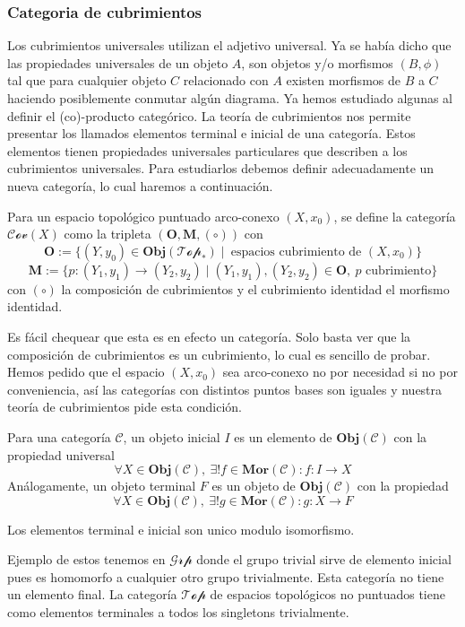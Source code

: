 \subsubsection{Categoria de cubrimientos}
Los cubrimientos universales utilizan el adjetivo universal. Ya se había
dicho que las propiedades universales de un objeto \(A\), son objetos
y/o morfismos \((B,\phi)\) tal que para cualquier objeto \(C\) relacionado
con \(A\) existen morfismos de \(B\) a \(C\) haciendo posiblemente
conmutar algún diagrama. Ya hemos estudiado algunas al definir el
(co)-producto categórico. La teoría de cubrimientos nos permite
presentar los llamados elementos terminal e inicial de una categoría.
Estos elementos tienen propiedades universales particulares que
describen a los cubrimientos universales. Para estudiarlos debemos
definir adecuadamente un nueva categoría, lo cual haremos a
continuación.
\begin{definicion}
  Para un espacio topológico puntuado arco-conexo \((X,x_0)\), se define
  la categoría \(\mathscr{Cov}(X)\) como la tripleta \(\left( \mathbf O,
  \mathbf M, (\circ) \right)\) con
\[ \mathbf O := \{ (Y, y_0) \in \mathbf{Obj}(\mathscr{Top_*}) \mid
    \ \text{espacios cubrimiento de } (X, x_0) \}\]
\[ \mathbf M := \{ p : (Y_1, y_1) \to (Y_2, y_2) \mid (Y_1, y_1), (Y_2,
  y_2) \in \mathbf O ,\ p \text{ cubrimiento}\}\]
  con \((\circ)\) la composición de cubrimientos y el cubrimiento
  identidad el morfismo identidad.
\end{definicion}
Es fácil chequear que esta es en efecto un categoría. Solo basta ver
que la composición de cubrimientos es un cubrimiento, lo cual es
sencillo de probar. Hemos pedido que el espacio \((X, x_0)\) sea
arco-conexo no por necesidad si no por conveniencia, así las categorías
con distintos puntos bases son iguales y nuestra teoría de cubrimientos
pide esta condición.

\begin{definicion}
  Para una categoría \(\mathscr C\), un objeto inicial \(I\) es un
  elemento de \(\mathbf{Obj} (\mathscr C)\) con la propiedad universal
  \[ \forall X \in \mathbf{Obj}(\mathscr C),\ \exists ! f \in
    \mathbf{Mor} (\mathscr C) : f : I \to X \]
  Análogamente, un objeto terminal \(F\) es un objeto de
  \(\mathbf{Obj} (\mathscr C)\) con la propiedad
  \[ \forall X \in \mathbf{Obj}(\mathscr C),\ \exists ! g \in
    \mathbf{Mor} (\mathscr C) : g : X \to F \]
\end{definicion}
\begin{acotacion}
  Los elementos terminal e inicial son unico modulo isomorfismo.
\end{acotacion}
Ejemplo de estos tenemos en \(\mathscr{Grp}\) donde el grupo trivial
sirve de elemento inicial pues es homomorfo a cualquier otro grupo
trivialmente. Esta categoría no tiene un elemento final. La categoría
\(\mathscr {Top}\) de espacios topológicos no puntuados tiene como
elementos terminales a todos los singletons trivialmente.

